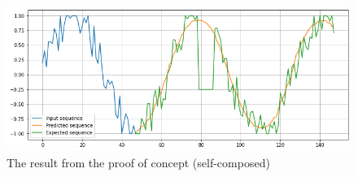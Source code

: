 \begin{figure}[H]
    \includegraphics[width=14cm]{assets/requirement-specification/poc-autoencoder.png}
    \caption{The result from the proof of concept (self-composed)}
    \label{fig:poc-autoencoder}
\end{figure}
